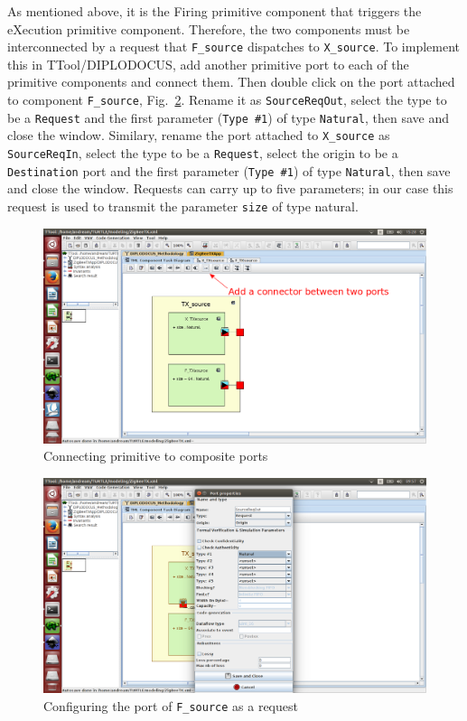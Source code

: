 \documentclass{llncs}
\newcommand{\screenshotsize}{1.0\textwidth}
\begin{document}
%
As mentioned above, it is the Firing primitive component that triggers the eXecution primitive component. Therefore, the
two components must be interconnected by a request that \texttt{F\_source} dispatches to \texttt{X\_source}. To
implement this in TTool/DIPLODOCUS, add another primitive port to each of the primitive components and connect them.
Then double click on the port attached to component \texttt{F\_source}, Fig.~\ref{fig:Ports4}. Rename it as
\texttt{SourceReqOut}, select the type to be a \texttt{Request} and the first parameter (\texttt{Type \#1}) of type
\texttt{Natural}, then save and close the window. Similary, rename the port attached to \texttt{X\_source} as
\texttt{SourceReqIn}, select the type to be a \texttt{Request}, select the origin to be a \texttt{Destination} port and
the first parameter (\texttt{Type \#1}) of type \texttt{Natural}, then save and close the window. Requests can carry up
to five parameters; in our case this request is used to transmit the parameter \texttt{size} of type natural.
%
\begin{figure}[!htbp]
	\centering
	\includegraphics[width=\screenshotsize]{figures/screenshot/Ports3.png}
	\caption{Connecting primitive to composite ports}
	\label{fig:Ports3}
\end{figure}
%
\begin{figure}[!htbp]
	\centering
	\includegraphics[width=\screenshotsize]{figures/screenshot/Ports4.png}
	\caption{Configuring the port of \texttt{F\_source} as a request}
	\label{fig:Ports4}
\end{figure}
\end{document}
